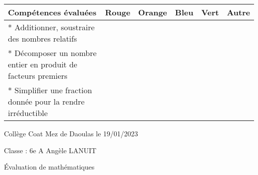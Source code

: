 \documentclass[a4paper,12pt,fleqn]{article}
\begin{document}
\begin{footnotesize}

\begin{center}

\begin{tabular}{|p{120mm}|p{8mm}|p{10mm}|p{8mm}|p{8mm}|p{8mm}|}

\hline
\textbf{Compétences évaluées} & \textbf{Rouge} & \textbf{Orange} & \textbf{Bleu} & \textbf{Vert} & \textbf{Autre} \\
\hline


*  Additionner, soustraire des nombres relatifs  & & & & & \\ 
\hline
*  Décomposer un nombre entier en produit de facteurs premiers  & & & & & \\ 
\hline
*  Simplifier une fraction donnée pour la rendre irréductible  & & & & & \\ 
\hline
\end{tabular}
\end{center}
\end{footnotesize}
 \par 
\medskip
 \par 
\medskip
 \par 
\medskip
\newpage
\setcounter{exo}{0}


Collège Coat Mez de Daoulas  \hfill  le 19/01/2023

Classe : 6e A \hfill Angèle LANUIT

\begin{center}
\begin{LARGE} Évaluation de mathématiques \end{LARGE}
\end{center}

\end{document}
